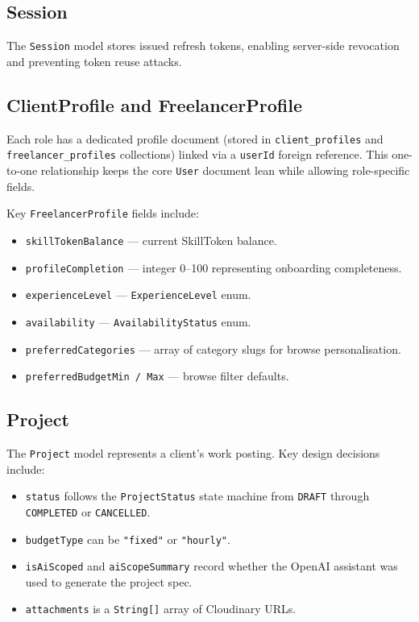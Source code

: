 \subsection{Session}

The \texttt{Session} model stores issued refresh tokens, enabling server-side revocation and preventing token reuse attacks.

\subsection{ClientProfile and FreelancerProfile}

Each role has a dedicated profile document (stored in \texttt{client\_profiles} and \texttt{freelancer\_profiles} collections) linked via a \texttt{userId} foreign reference. This one-to-one relationship keeps the core \texttt{User} document lean while allowing role-specific fields.

Key \texttt{FreelancerProfile} fields include:

\begin{itemize}
  \item \texttt{skillTokenBalance} — current SkillToken balance.
  \item \texttt{profileCompletion} — integer 0–100 representing onboarding completeness.
  \item \texttt{experienceLevel} — \texttt{ExperienceLevel} enum.
  \item \texttt{availability} — \texttt{AvailabilityStatus} enum.
  \item \texttt{preferredCategories} — array of category slugs for browse personalisation.
  \item \texttt{preferredBudgetMin / Max} — browse filter defaults.
\end{itemize}

\subsection{Project}

The \texttt{Project} model represents a client's work posting. Key design decisions include:

\begin{itemize}
  \item \texttt{status} follows the \texttt{ProjectStatus} state machine from \texttt{DRAFT} through \texttt{COMPLETED} or \texttt{CANCELLED}.
  \item \texttt{budgetType} can be \texttt{"fixed"} or \texttt{"hourly"}.
  \item \texttt{isAiScoped} and \texttt{aiScopeSummary} record whether the OpenAI assistant was used to generate the project spec.
  \item \texttt{attachments} is a \texttt{String[]} array of Cloudinary URLs.
\end{itemize}

